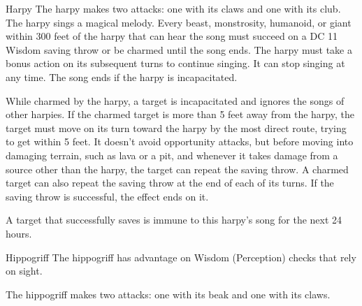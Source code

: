 \begin{DndMonster}{Harpy}
	\DndMonsterBasics[armor-class={11}, hit-points={38 (7d8 + 7)}, speed={20 ft., fly 40 ft.}]
	\DndMonsterDetails[saving-throws={}, skills={}, damage-immunities={}, damage-resistances={}, damage-vulnerabilities={}, condition-immunities={}, senses={passive Perception 10}, languages={Common}, challenge={1:1}]
	 The harpy makes two attacks: one with its claws and one with its club.
	\DndMonsterAttack[
		name=Claws,
		distance=melee,
		type=weapon,
		mod=+3,
		reach=5,
		dmg=\DndDice{2d4 + 1},
		dmg-type=slashing
	]
	\DndMonsterAttack[
		name=Club,
		distance=melee,
		type=weapon,
		mod=+3,
		reach=5,
		dmg=\DndDice{1d4 + 1},
		dmg-type=bludgeoning
	]
	The harpy sings a magical melody. Every beast, monstrosity, humanoid, or giant within 300 feet of the harpy that can hear the song must succeed on a DC 11 Wisdom saving throw or be charmed until the song ends. The harpy must take a bonus action on its subsequent turns to continue singing. It can stop singing at any time. The song ends if the harpy is incapacitated.
	
	While charmed by the harpy, a target is incapacitated and ignores the songs of other harpies. If the charmed target is more than 5 feet away from the harpy, the target must move on its turn toward the harpy by the most direct route, trying to get within 5 feet. It doesn't avoid opportunity attacks, but before moving into damaging terrain, such as lava or a pit, and whenever it takes damage from a source other than the harpy, the target can repeat the saving throw. A charmed target can also repeat the saving throw at the end of each of its turns. If the saving throw is successful, the effect ends on it.
	
	A target that successfully saves is immune to this harpy's song for the next 24 hours.
\end{DndMonster}
		
\begin{DndMonster}{Hippogriff}
	\DndMonsterBasics[armor-class={11}, hit-points={25 (4d10 + 4)}, speed={40 ft., fly 60 ft.}]
	\DndMonsterDetails[saving-throws={}, skills={Perception +5}, damage-immunities={}, damage-resistances={}, damage-vulnerabilities={}, condition-immunities={}, senses={passive Perception 15}, languages={—}, challenge={2:1/2}]
	 The hippogriff has advantage on Wisdom (Perception) checks that rely on sight.
	
	 The hippogriff makes two attacks: one with its beak and one with its claws.
	\DndMonsterAttack[
		name=Beak,
		distance=melee,
		type=weapon,
		mod=+5,
		reach=5,
		dmg=\DndDice{1d10 + 3},
		dmg-type=piercing
	]
	\DndMonsterAttack[
		name=Claws,
		distance=melee,
		type=weapon,
		mod=+5,
		reach=5,
		dmg=\DndDice{2d6 + 3},
		dmg-type=slashing
	]
\end{DndMonster}
		

